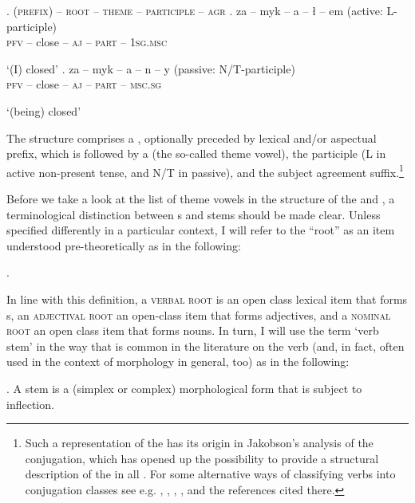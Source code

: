 \ex.\label{zamykac}
\textsc{(prefix) -- root -- theme -- participle -- agr}
\ag.
za -- myk -- a -- \l {} -- em (active: L-participle)\label{1a} \\
\textsc{pfv} -- close -- \textsc{aj} -- \textsc{part} -- \textsc{1sg.msc} \\
\strut `(I) closed' 
\bg. za -- myk -- a -- n -- y \hskip 0.15cm (passive: N/T-participle)\label{1b}\\
\textsc{pfv} -- close -- \textsc{aj} -- \textsc{part} -- \textsc{msc.sg} \\
\strut `(being) closed' 

\enlargethispage{20pt}
The  structure comprises a , optionally preceded by lexical and/or aspectual prefix, which is followed by a  (the so-called theme vowel), the participle 
(L in active non-present tense, and N/T in passive), and the subject agreement suffix.\footnote{Such a  representation of the   has its origin in Jakobson's \citeyearpar{Jakobson1948} analysis of the  conjugation, which has opened up the possibility to provide a structural description of the  in all . For some alternative ways of classifying  verbs into conjugation classes see e.g. \cite{Laskowski1975}, \cite{towjand}, \cite{czayk1988}, \cite{Jablonska2007}, and the references cited there.
}%
\par
Before we take a look at the list of theme vowels in the structure of the  and  , a terminological distinction between s and stems should be made clear. Unless specified differently in a particular context, I will refer to the ``root'' as an item understood pre-theoretically as in the following:

\ex. 

In line with this definition, a \textsc{verbal root} is an open class lexical item that forms s, an \textsc{adjectival root} an open-class item that forms adjectives, and a \textsc{nominal root} an open class item that forms nouns. 
In turn, I will use the term `verb stem' in the way that is common in the literature on the  verb (and, in fact,  often used in the context of  morphology in general, too) as in the following:

\ex. A  stem is a (simplex or complex) morphological form that is subject to inflection. 

